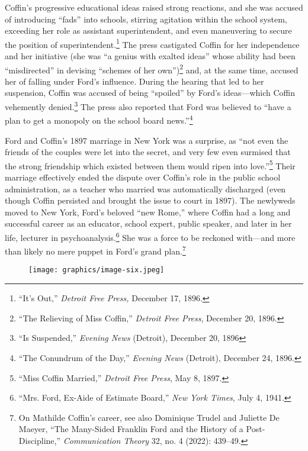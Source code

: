 \documentclass[twoside,symmetric,nobib,justified]{tufte-book}
\begin{document}
Coffin's progressive educational ideas raised strong reactions, and she
was accused of introducing ``fads'' into schools, stirring agitation
within the school system, exceeding her role as assistant
superintendent, and even maneuvering to secure the position of
superintendent.\footnote{``It's Out,'' \emph{Detroit Free Press,}
  December 17, 1896.} The press castigated Coffin for her independence
and her initiative (she was ``a genius with exalted ideas'' whose
ability had been ``misdirected'' in devising ``schemes of her
own'')\footnote{``The Relieving of Miss Coffin,'' \emph{Detroit Free
  Press}, December 20, 1896.} and, at the same time, accused her of
falling under Ford's influence. During the hearing that led to her
suspension, Coffin was accused of being ``spoiled'' by Ford's
ideas---which Coffin vehemently denied.\footnote{``Is Suspended,''
  \emph{Evening News} (Detroit), December 20, 1896} The press also
reported that Ford was believed to ``have a plan to get a monopoly on
the school board news.''\footnote{``The Conundrum of the Day,''
  \emph{Evening News} (Detroit), December 24, 1896.}

Ford and Coffin's 1897 marriage in New York was a surprise, as ``not
even the friends of the couples were let into the secret, and very few
even surmised that the strong friendship which existed between them
would ripen into love.''\footnote{``Miss Coffin Married,'' \emph{Detroit
  Free Press}, May 8, 1897.} Their marriage effectively ended the
dispute over Coffin's role in the public school administration, as a
teacher who married was automatically discharged (even though Coffin
persisted and brought the issue to court in 1897). The newlyweds moved
to New York, Ford's beloved ``new Rome,'' where Coffin had a long and
successful career as an educator, school expert, public speaker, and
later in her life, lecturer in psychoanalysis.\footnote{``Mrs. Ford,
  Ex-Aide of Estimate Board,'' \emph{New York Times}, July 4, 1941.} She
was a force to be reckoned with---and more than likely no mere puppet in
Ford's grand plan.\footnote{On Mathilde Coffin's career, see also
  Dominique Trudel and Juliette De Maeyer, ``The Many-Sided Franklin
  Ford and the History of a Post-Discipline,'' \emph{Communication
  Theory} 32, no. 4 (2022): 439--49.}

\begin{figure}
   \texttt{[image: graphics/image-six.jpeg]}
   \label{fig:fig6}
\end{figure}
\end{document}
